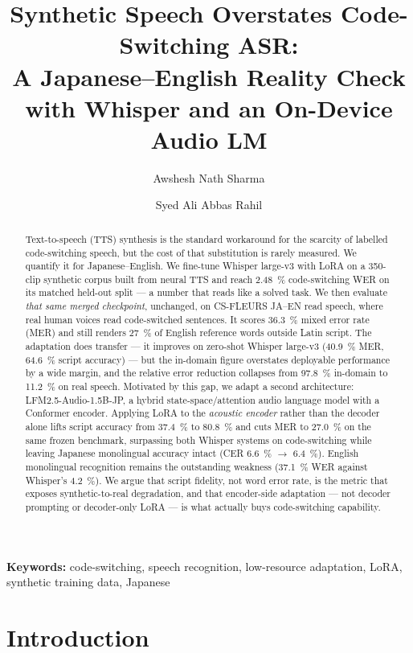 \documentclass[11pt,a4paper]{article}
\title{\bfseries Synthetic Speech Overstates Code-Switching ASR:\\
A Japanese--English Reality Check with Whisper and an On-Device Audio LM}
\author[1]{Awshesh Nath Sharma}
\author[2]{Syed Ali Abbas Rahil}
\affil[1]{\normalsize University of Liverpool}
\affil[2]{\normalsize Otsuka Shokai}
\date{}
\begin{document}
\maketitle

\begin{abstract}
\noindent
Text-to-speech (TTS) synthesis is the standard workaround for the scarcity of
labelled code-switching speech, but the cost of that substitution is rarely
measured. We quantify it for Japanese--English. We fine-tune Whisper large-v3
with LoRA on a 350-clip synthetic corpus built from neural TTS and reach
\SI{2.48}{\percent} code-switching WER on its matched held-out split --- a number
that reads like a solved task. We then evaluate \emph{that same merged
checkpoint}, unchanged, on CS-FLEURS JA--EN read speech, where real human voices
read code-switched sentences. It scores \SI{36.3}{\percent} mixed error rate
(MER) and still renders \SI{27}{\percent} of English reference words outside
Latin script. The adaptation does transfer --- it improves on zero-shot Whisper
large-v3 (\SI{40.9}{\percent} MER, \SI{64.6}{\percent} script accuracy) --- but
the in-domain figure overstates deployable performance by a wide margin, and the
relative error reduction collapses from \SI{97.8}{\percent} in-domain to
\SI{11.2}{\percent} on real speech. Motivated by this gap, we adapt a second
architecture: LFM2.5-Audio-1.5B-JP, a hybrid state-space/attention audio language
model with a Conformer encoder. Applying LoRA to the \emph{acoustic encoder}
rather than the decoder alone lifts script accuracy from \SI{37.4}{\percent} to
\SI{80.8}{\percent} and cuts MER to \SI{27.0}{\percent} on the same frozen
benchmark, surpassing both Whisper systems on code-switching while leaving
Japanese monolingual accuracy intact (CER \SI{6.6}{\percent} $\rightarrow$
\SI{6.4}{\percent}). English monolingual recognition remains the outstanding
weakness (\SI{37.1}{\percent} WER against Whisper's \SI{4.2}{\percent}). We argue
that script fidelity, not word error rate, is the metric that exposes
synthetic-to-real degradation, and that encoder-side adaptation --- not decoder
prompting or decoder-only LoRA --- is what actually buys code-switching capability.
\end{abstract}

\medskip
\noindent\textbf{Keywords:} code-switching, speech recognition, low-resource
adaptation, LoRA, synthetic training data, Japanese

\section{Introduction}
\end{document}

